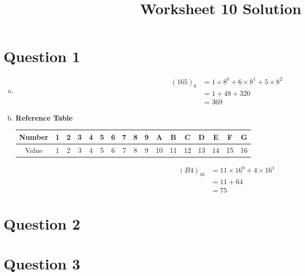 \documentclass[12pt]{article}
\begin{document}
\title{Worksheet 10 Solution}
\maketitle

\section*{Question 1}
\begin{enumerate}[a.]
    \item

    \begin{align}
        (165)_8 &= 1 \times 8^0 + 6 \times 8^1 + 5 \times 8^2\\
        &= 1 + 48 + 320\\
        &= 369
    \end{align}

    \item

    \textbf{Reference Table}

    \bigskip

    \begin{tabular}{ c|c|c|c|c|c|c|c|c|c|c|c|c|c|c|c|c }
        Number & 1 & 2 & 3 & 4 & 5 & 6 & 7 & 8 & 9 & A & B & C & D & E & F & G\\
        \hline
        Value & 1 & 2 & 3 & 4 & 5 & 6 & 7 & 8 & 9 & 10 & 11 & 12 & 13 & 14 & 15 & 16
    \end{tabular}

    \setcounter{equation}{0}
    \begin{align}
        (B4)_{16} &= 11 \times 16^0 + 4 \times 16^1\\
        &= 11 + 64\\
        &= 75
    \end{align}

\end{enumerate}

\section*{Question 2}

\section*{Question 3}
\end{document}
